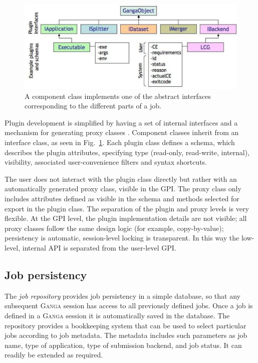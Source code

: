 \documentclass{elsart}
\def\ganga {\textsc{Ganga}\xspace}
\def\GPI{GPI\xspace}
\begin{document}
\begin{figure}
  \centering
  \includegraphics[width=14cm]{GangaPlugin.pdf}  
  \caption{A component class implements one of the abstract interfaces
    corresponding to the different parts of a job.}
  \label{fig:Components}
\end{figure}
Plugin development is simplified by having a set of internal interfaces and a
mechanism for generating proxy classes \cite{GoF}. Component classes inherit from an interface class,
as seen in Fig.~\ref{fig:Components}. Each plugin class defines a schema, which
describes the plugin attributes, specifying type
(read-only, read-write, internal), visibility, associated user-convenience filters
and syntax shortcuts.

The user does not interact with the plugin class directly but rather with an
automatically generated proxy class, visible in the \GPI. The proxy
class only includes attributes defined as visible in the schema and methods
selected for export in the plugin class. The separation of the plugin and
proxy levels is very flexible. At the \GPI level, the plugin implementation
details are not visible; all proxy classes follow the same design logic (for
example, copy-by-value); persistency is automatic, session-level locking
is transparent. In this way the low-level, internal API is
separated from the user-level \GPI.

\subsection{Job persistency}
\label{sec:persistency}
The \emph{job repository} provides job persistency in a simple database,
so that any subsequent \ganga session has access to all previously
defined jobs. Once a job is defined in a \ganga session it is automatically
saved in the database. The repository provides a bookkeeping system that can
be used to select particular jobs according to job metadata. The metadata
includes such parameters as job name, type of application, type of submission
backend, and job status. It can readily be extended as required.
\end{document}
